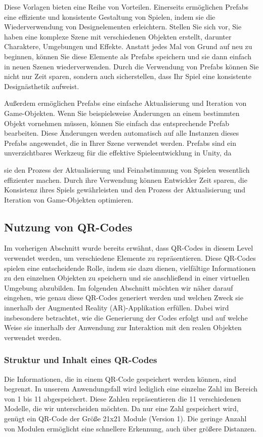 Diese Vorlagen bieten eine Reihe von Vorteilen. Einerseits ermöglichen Prefabs eine effiziente und konsistente Gestaltung
von Spielen, indem sie die Wiederverwendung von Designelementen erleichtern. Stellen Sie sich vor, Sie haben eine komplexe
Szene mit verschiedenen Objekten erstellt, darunter Charaktere, Umgebungen und Effekte. Anstatt jedes Mal von Grund auf
neu zu beginnen, können Sie diese Elemente als Prefabs speichern und sie dann einfach in neuen Szenen wiederverwenden.
Durch die Verwendung von Prefabs können Sie nicht nur Zeit sparen, sondern auch sicherstellen, dass Ihr Spiel eine
konsistente Designästhetik aufweist.

Außerdem ermöglichen Prefabs eine einfache Aktualisierung und Iteration von Game-Objekten. Wenn Sie beispielsweise
Änderungen an einem bestimmten Objekt vornehmen müssen, können Sie einfach das entsprechende Prefab bearbeiten. Diese
Änderungen werden automatisch auf alle Instanzen dieses Prefabs angewendet, die in Ihrer Szene verwendet werden. Prefabs
sind ein unverzichtbares Werkzeug für die effektive Spieleentwicklung in Unity, da

sie den Prozess der Aktualisierung und Feinabstimmung von Spielen wesentlich effizienter machen. Durch ihre Verwendung
können Entwickler Zeit sparen, die Konsistenz ihres Spiels gewährleisten und den Prozess der Aktualisierung und Iteration
von Game-Objekten optimieren.

\subsection{Nutzung von QR-Codes}
Im vorherigen Abschnitt wurde bereits erwähnt, dass QR-Codes in diesem Level verwendet werden, um verschiedene Elemente
zu repräsentieren. Diese QR-Codes spielen eine entscheidende Rolle, indem sie dazu dienen, vielfältige Informationen zu
den einzelnen Objekten zu speichern und sie anschließend in einer virtuellen Umgebung abzubilden. Im folgenden Abschnitt
möchten wir näher darauf eingehen, wie genau diese QR-Codes generiert werden und welchen Zweck sie innerhalb der
Augmented Reality (AR)-Applikation erfüllen. Dabei wird insbesondere betrachtet, wie die Generierung der Codes erfolgt
und auf welche Weise sie innerhalb der Anwendung zur Interaktion mit den realen Objekten verwendet werden.

\subsubsection{Struktur und Inhalt eines QR-Codes}
Die Informationen, die in einem QR-Code gespeichert werden können, sind begrenzt. In unserem Anwendungsfall wird lediglich
eine einzelne Zahl im Bereich von 1 bis 11 abgespeichert. Diese Zahlen repräsentieren die 11 verschiedenen Modelle, die
wir unterscheiden möchten. Da nur eine Zahl gespeichert wird, genügt ein QR-Code der Größe 21x21 Module (Version 1). Die
geringe Anzahl von Modulen ermöglicht eine schnellere Erkennung, auch über größere Distanzen.

